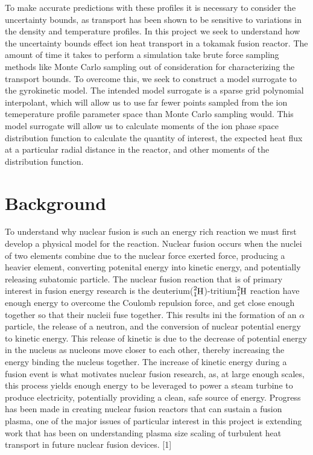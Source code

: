 \documentclass{article}
\begin{document}
\vspace{0.01cm}

To make accurate predictions with these profiles it is necessary to consider the uncertainty bounds, as transport has been shown to be sensitive to variations in the density and temperature profiles. In this project we seek to understand how the uncertainty bounds effect ion heat transport in a tokamak fusion reactor. The amount of time it takes to perform a simulation take brute force sampling methods like Monte Carlo sampling out of consideration for characterizing the transport bounds. To overcome this, we seek to construct a model surrogate to the gyrokinetic model. The intended model surrogate is a sparse grid polynomial interpolant, which will allow us to use far fewer points sampled from the ion temeperature profile parameter space than Monte Carlo sampling would. This model surrogate will allow us to calculate moments of the ion phase space distribution function to calculate the quantity of interest, the expected heat flux at a particular radial distance in the reactor, and other moments of the distribution function.  \\
\newpage
\section{Background}
To understand why nuclear fusion is such an energy rich reaction we must first develop a physical model for the reaction. Nuclear fusion occurs when the nuclei of two elements combine due to the nuclear force exerted force, producing a heavier element, converting potenital energy into kinetic energy, and potentially releasing subatomic particle. The nuclear fusion reaction that is of primary interest in fusion energy research is the deuterium($\ce{^2_1H}$)-tritium$\ce{^2_1H}$ reaction have enough energy to overcome the Coulomb repulsion force, and get close enough together so that their nucleii fuse together. This results ini the formation of an $\alpha$ particle, the release of a neutron, and the conversion of nuclear potential energy to kinetic energy. This release of kinetic is due to the decrease of potential energy in the nucleus as nucleons move closer to each other, thereby increasing the energy binding the nucleus together. The increase of kinetic energy during a fusion event is what motivates nuclear fusion research, as, at large enough scales, this process yields enough energy to be leveraged to power a steam turbine to produce electricity, potentially providing a clean, safe source of energy. Progress has been made in creating nuclear fusion reactors that can sustain a fusion plasma, one of the major issues of particular interest in this project is extending work that has been on understanding plasma size scaling of turbulent heat transport in future nuclear fusion devices. [1]\\
\end{document}

